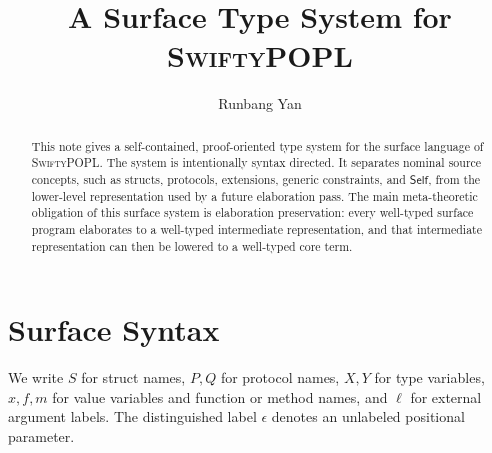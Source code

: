 \documentclass[manuscript]{acmart}
\newcommand{\lang}{\textsc{SwiftyPOPL}}
\newcommand{\kw}[1]{\ensuremath{\mathsf{#1}}}
\newcommand{\Self}{\kw{Self}}
\begin{document}
\title{A Surface Type System for \lang}

\author{Runbang Yan}

\renewcommand{\shortauthors}{Yan}

\begin{abstract}
This note gives a self-contained, proof-oriented type system for the surface language of \lang.
The system is intentionally syntax directed.
It separates nominal source concepts, such as structs, protocols, extensions, generic constraints, and \Self, from the lower-level representation used by a future elaboration pass.
The main meta-theoretic obligation of this surface system is elaboration preservation: every well-typed surface program elaborates to a well-typed intermediate representation, and that intermediate representation can then be lowered to a well-typed core term.
\end{abstract}

\maketitle

\section{Surface Syntax}

We write $S$ for struct names, $P,Q$ for protocol names, $X,Y$ for type variables, $x,f,m$ for value variables and function or method names, and $\ell$ for external argument labels.
The distinguished label $\epsilon$ denotes an unlabeled positional parameter.
\end{document}
